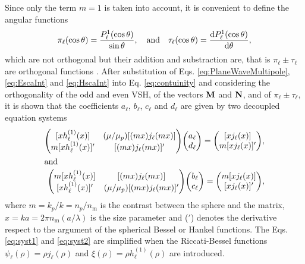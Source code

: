 Since only the term $m=1$ is taken into account, it is convenient to define the angular functions
%
\begin{align}
 \pi_\ell(\cos\theta )  = \frac{P_\ell^1(\cos\theta)}{\sin\theta},\qqtext{and}
 \tau_\ell(\cos\theta) = \dv{P_\ell^1(\cos\theta)}{\theta},
 \label{eq:PiTau}
\end{align}
%
which are not orthogonal but their addition and substraction are, that is $\pi_\ell \pm \tau_\ell$ are orthogonal functions \cite{bohren_absorption_1983}. After substitution  of Eqs. \eqref{eq:PlaneWaveMultipole}, \eqref{eq:EscaInt} and \eqref{eq:HscaInt} into Eq. \eqref{eq:contuinity} and considering the orthogonality of the odd and even VSH, of the vectors $\vb{M}$ and $\vb{N}$, and of $\pi_\ell \pm \tau_\ell$, it is shown that the coefficients $a_\ell$, $b_\ell$, $c_\ell$ and $d_\ell$ are given by two decoupled equation systems
%
\begin{align}
\mqty([x h_\ell^{(1)}(x)]  & (\mu/\mu_p) [(mx) j_\ell(mx)] \\
		m[x h_\ell^{(1)}(x)]' & [(mx) j_\ell(mx)]')
		\mqty(a_\ell \\ d_\ell) = \mqty([xj_\ell(x)] \\ m[x j_\ell(x)]') ,
	\label{eq:syst1}
		\\
\intertext{and}
\mqty( m[xh_\ell^{(1)}(x)]  &  [(mx)j_\ell(mx)] \\
		[x h_\ell^{(1)}(x)]' & (\mu/\mu_p)[(mx) j_\ell(mx)]' )
		\mqty(b_\ell \\ c_\ell) = \mqty(m[xj_\ell(x)] \\ [x j_\ell(x)]'),
	\label{eq:syst2}
\end{align}
%
where $m = k_p / k = n_p / n_\text{m}$ is the contrast between the sphere and the matrix, $x= ka = 2\pi n_\text{m} (a/\lambda)$ is the size parameter and  ($'$) denotes the derivative respect to the argument of the spherical Bessel or Hankel functions. The Eqs. \eqref{eq:syst1} and \eqref{eq:syst2} are simplified when the Riccati-Bessel functions $\psi_\ell( \rho) = \rho j_\ell(\rho)$ and $\xi(\rho) = \rho h_\ell^{(1)}(\rho)$ are introduced.


